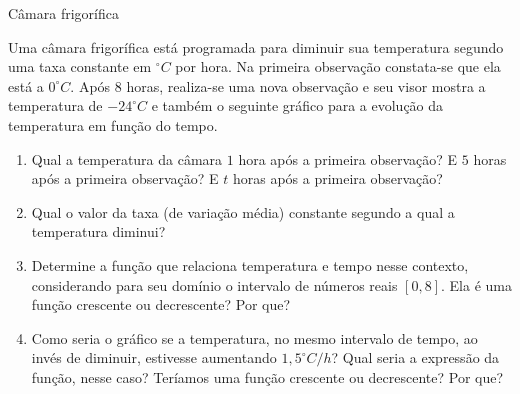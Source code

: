 \begin{task}{Câmara frigorífica}
\label{ativ-camara}


Uma câmara frigorífica está programada para diminuir sua temperatura segundo uma taxa constante em \(^\circ C\) por hora. Na primeira observação constata-se que ela está a \(0^\circ C\). Após \(8\) horas, realiza-se uma nova observação e seu visor mostra a temperatura de \(-24^\circ C\) e também o seguinte gráfico para a evolução da temperatura em função do tempo.

\begin{figure}[H]
\centering

\end{figure}
\begin{enumerate}
\item {} 
Qual a temperatura da câmara \(1\) hora após a primeira observação? E \(5\) horas após a primeira observação? E \(t\) horas após a primeira observação?

\item {} 
Qual o valor da taxa (de variação média) constante segundo a qual a temperatura diminui?

\item {} 
Determine a função que relaciona temperatura e tempo nesse contexto, considerando para seu domínio o intervalo de números reais \([0,8]\). Ela é uma função crescente ou decrescente? Por que?

\item {} 
Como seria o gráfico se a temperatura, no mesmo intervalo de tempo, ao invés de diminuir, estivesse aumentando \(1,5^\circ C/h\)? Qual seria a expressão da função, nesse caso? Teríamos uma função crescente ou decrescente? Por que?

\end{enumerate}
\end{task}

